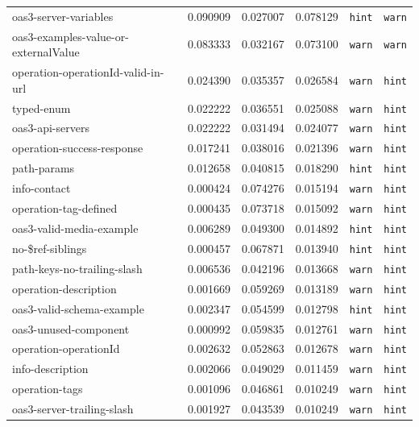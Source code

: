 {\begin{longtable}{lrrrrr}
  oas3-server-variables &  0.090909 &  0.027007 & 0.078129 & \texttt{hint} &  \texttt{warn} \\ 
  oas3-examples-value-or-externalValue & 0.083333 &  0.032167 & 0.073100 & \texttt{warn} &  \texttt{warn} \\ \hline
  operation-operationId-valid-in-url & 0.024390 &  0.035357 & 0.026584 & \texttt{warn} &  \texttt{hint} \\ 
  typed-enum & 0.022222 &  0.036551 & 0.025088 & \texttt{warn} &  \texttt{hint} \\ 
  oas3-api-servers & 0.022222 &  0.031494 & 0.024077 & \texttt{warn} &  \texttt{hint} \\ 
  operation-success-response & 0.017241 &  0.038016 & 0.021396 & \texttt{warn} &  \texttt{hint} \\ 
  path-params &  0.012658 &  0.040815 & 0.018290 & \texttt{hint} &  \texttt{hint} \\ 
  info-contact & 0.000424 &  0.074276 & 0.015194 & \texttt{warn} &  \texttt{hint} \\ 
  operation-tag-defined &  0.000435 &  0.073718 & 0.015092 & \texttt{warn} &  \texttt{hint} \\ 
  oas3-valid-media-example & 0.006289 &  0.049300 & 0.014892 & \texttt{hint} &  \texttt{hint} \\ 
  no-\$ref-siblings & 0.000457 &  0.067871 & 0.013940 & \texttt{hint} &  \texttt{hint} \\ 
  path-keys-no-trailing-slash &  0.006536 &  0.042196 & 0.013668 & \texttt{warn} &  \texttt{hint} \\ 
  operation-description &  0.001669 &  0.059269 & 0.013189 & \texttt{warn} &  \texttt{hint} \\ 
  oas3-valid-schema-example &  0.002347 &  0.054599 & 0.012798 & \texttt{hint} &  \texttt{hint} \\ 
  oas3-unused-component &  0.000992 &  0.059835 & 0.012761 & \texttt{warn} &  \texttt{hint} \\ 
  operation-operationId &  0.002632 &  0.052863 & 0.012678 & \texttt{warn} &  \texttt{hint} \\ 
  info-description & 0.002066 &  0.049029 & 0.011459 & \texttt{warn} &  \texttt{hint} \\ 
  operation-tags & 0.001096 &  0.046861 & 0.010249 & \texttt{warn} &  \texttt{hint} \\ 
  oas3-server-trailing-slash & 0.001927 &  0.043539 & 0.010249 & \texttt{warn} &  \texttt{hint} \\ \hline\hline
\end{longtable}
}


